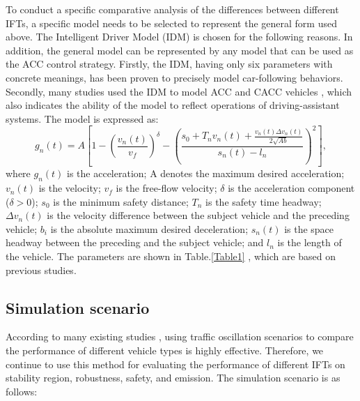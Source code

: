 \documentclass[journal]{IEEEtran}
\begin{document}
To conduct a specific comparative analysis of the differences between different IFTs, a specific model needs to be selected to represent the general form used above. The Intelligent Driver Model (IDM) is chosen for the following reasons. In addition, the general model can be represented by any model that can be used as the ACC control strategy. Firstly, the IDM, having only six parameters with concrete meanings, has been proven to precisely model car-following behaviors. Secondly, many studies used the IDM to model ACC and CACC vehicles \citep{chang2020analysis,li2017evaluation}, which also indicates the ability of the model to reflect operations of driving-assistant systems. The model is expressed as:
\begin{equation}
g_{n}(t)=A\left[1-\left(\frac{v_{n}(t)}{v_{f}}\right)^{\delta}-\left(\frac{s_{0}+T_{n} v_{n}(t)+\frac{v_{n}(t) \Delta v_{n}(t)}{2 \sqrt{A b}}}{s_{n}(t)-l_{n}}\right)^{2}\right],
\label{Eq23}
\end{equation}
where $g_n (t)$ is the acceleration; A denotes the maximum desired acceleration; $v_n (t)$ is the velocity; $v_f$ is the free-flow velocity; $\delta$ is the acceleration component ($\delta>0$); $s_0$ is the minimum safety distance; $T_n$ is the safety time headway; $\Delta v_n (t)$ is the velocity difference between the subject vehicle and the preceding vehicle; $b_i$ is the absolute maximum desired deceleration; $s_n (t)$ is the space headway between the preceding and the subject vehicle; and $l_n$ is the length of the vehicle. The parameters are shown in Table.\ref{Table1} \citep{kesting2008adaptive,kesting2007jam}, which are based on previous studies.

\begin{table}
\centering
\setlength{\abovecaptionskip}{0pt}
\setlength{\belowcaptionskip}{10pt}%
\caption{Parameters chosen for IDM.}
\label{Table1}
\end{table}

\subsection{Simulation scenario}
\label{Section 5.1}
According to many existing studies \citep{gong2016constrained,li2014stop}, using traffic oscillation scenarios to compare the performance of different vehicle types is highly effective. Therefore, we continue to use this method for evaluating the performance of different IFTs on stability region, robustness, safety, and emission. The simulation scenario is as follows:
\end{document}
